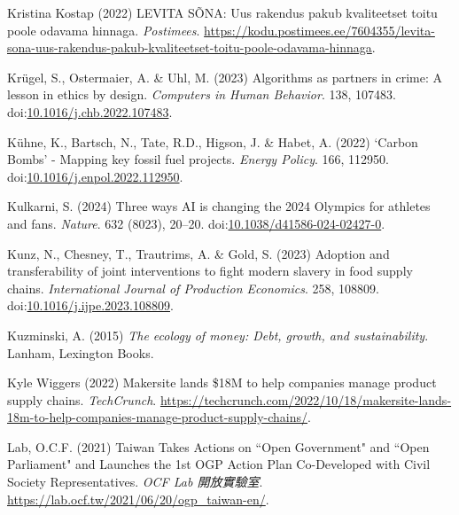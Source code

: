 \documentclass[
  letterpaper,
  DIV=11,
  numbers=noendperiod]{scrartcl}
\newlength{\cslhangindent}
\newenvironment{CSLReferences}[2] %
 {\begin{list}{}{%
  \setlength{\itemindent}{0pt}
  \setlength{\leftmargin}{0pt}
  \setlength{\parsep}{0pt}
  \ifodd #1
   \setlength{\leftmargin}{\cslhangindent}
   \setlength{\itemindent}{-1\cslhangindent}
  \fi
  \setlength{\itemsep}{#2\baselineskip}}}
 {\end{list}}
\begin{document}
\begin{CSLReferences}{0}{1}
Kristina Kostap (2022) {LEVITA S{Õ}NA: Uus rakendus pakub kvaliteetset
toitu poole odavama hinnaga}. \emph{Postimees}.
\url{https://kodu.postimees.ee/7604355/levita-sona-uus-rakendus-pakub-kvaliteetset-toitu-poole-odavama-hinnaga}.

Krügel, S., Ostermaier, A. \& Uhl, M. (2023) Algorithms as partners in
crime: {A} lesson in ethics by design. \emph{Computers in Human
Behavior}. 138, 107483.
doi:\href{https://doi.org/10.1016/j.chb.2022.107483}{10.1016/j.chb.2022.107483}.

Kühne, K., Bartsch, N., Tate, R.D., Higson, J. \& Habet, A. (2022)
{`{Carbon Bombs}'} - {Mapping} key fossil fuel projects. \emph{Energy
Policy}. 166, 112950.
doi:\href{https://doi.org/10.1016/j.enpol.2022.112950}{10.1016/j.enpol.2022.112950}.

Kulkarni, S. (2024) Three ways {AI} is changing the 2024 {Olympics} for
athletes and fans. \emph{Nature}. 632 (8023), 20--20.
doi:\href{https://doi.org/10.1038/d41586-024-02427-0}{10.1038/d41586-024-02427-0}.

Kunz, N., Chesney, T., Trautrims, A. \& Gold, S. (2023) Adoption and
transferability of joint interventions to fight modern slavery in food
supply chains. \emph{International Journal of Production Economics}.
258, 108809.
doi:\href{https://doi.org/10.1016/j.ijpe.2023.108809}{10.1016/j.ijpe.2023.108809}.

Kuzminski, A. (2015) \emph{The ecology of money: Debt, growth, and
sustainability}. Lanham, Lexington Books.

Kyle Wiggers (2022) Makersite lands \${18M} to help companies manage
product supply chains. \emph{TechCrunch}.
\url{https://techcrunch.com/2022/10/18/makersite-lands-18m-to-help-companies-manage-product-supply-chains/}.

Lab, O.C.F. (2021) {Taiwan Takes Actions on ``Open Government" and
``Open Parliament" and Launches the 1st OGP Action Plan Co-Developed
with Civil Society Representatives}. \emph{OCF Lab 開放實驗室}.
\url{https://lab.ocf.tw/2021/06/20/ogp_taiwan-en/}.


\end{CSLReferences}
\end{document}
